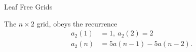 \documentclass{beamer}%
\begin{document}
\begin{frame}{Leaf Free Grids} %
  
  The $n \times 2$ grid, obeys the recurrence
  \begin{align*}
    a_2(1) &= 1,\ a_2(2) = 2 \\
    a_2(n) &= 5a(n-1) - 5a(n-2).
  \end{align*}
\end{frame}
\end{document}
